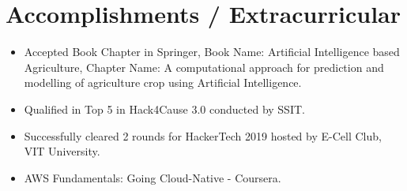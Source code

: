 \documentclass[letterpaper,11pt]{article}
\newcommand{\resumeItem}[1]{
  \item\small{
    {#1 \vspace{-2pt}}
  }
}
\newcommand{\resumeItemListStart}{\begin{itemize}}
\newcommand{\resumeItemListEnd}{\end{itemize}\vspace{-5pt}}
\begin{document}
\section{Accomplishments / Extracurricular}
    \resumeItemListStart
                \resumeItem{Accepted Book Chapter in Springer, Book Name: Artificial Intelligence based Agriculture, Chapter Name: A computational approach for prediction and modelling of agriculture crop using Artificial Intelligence.}
                \vspace{-5pt}
                \resumeItem{Qualified in Top 5 in Hack4Cause 3.0 conducted by SSIT.}
                \vspace{-5pt}
                \resumeItem{Successfully cleared 2 rounds for HackerTech 2019 hosted by E-Cell Club, VIT University.}
                \vspace{-5pt}
                \resumeItem{AWS Fundamentals: Going Cloud-Native - Coursera.}
    \resumeItemListEnd
\end{document}
